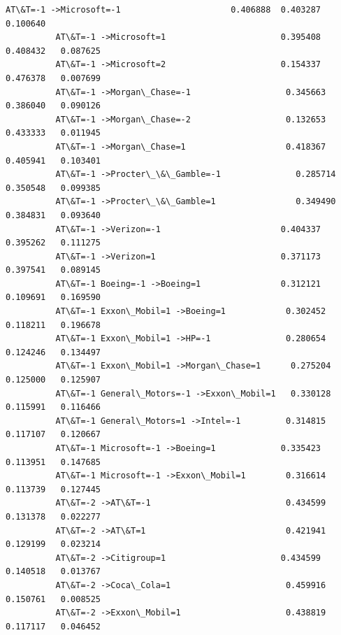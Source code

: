 \documentclass[11pt]{article}
\begin{document}
\begin{Verbatim}[commandchars=\\\{\}]
          AT\&T=-1 ->Microsoft=-1                      0.406888  0.403287   0.100640   
          AT\&T=-1 ->Microsoft=1                       0.395408  0.408432   0.087625   
          AT\&T=-1 ->Microsoft=2                       0.154337  0.476378   0.007699   
          AT\&T=-1 ->Morgan\_Chase=-1                   0.345663  0.386040   0.090126   
          AT\&T=-1 ->Morgan\_Chase=-2                   0.132653  0.433333   0.011945   
          AT\&T=-1 ->Morgan\_Chase=1                    0.418367  0.405941   0.103401   
          AT\&T=-1 ->Procter\_\&\_Gamble=-1               0.285714  0.350548   0.099385   
          AT\&T=-1 ->Procter\_\&\_Gamble=1                0.349490  0.384831   0.093640   
          AT\&T=-1 ->Verizon=-1                        0.404337  0.395262   0.111275   
          AT\&T=-1 ->Verizon=1                         0.371173  0.397541   0.089145   
          AT\&T=-1 Boeing=-1 ->Boeing=1                0.312121  0.109691   0.169590   
          AT\&T=-1 Exxon\_Mobil=1 ->Boeing=1            0.302452  0.118211   0.196678   
          AT\&T=-1 Exxon\_Mobil=1 ->HP=-1               0.280654  0.124246   0.134497   
          AT\&T=-1 Exxon\_Mobil=1 ->Morgan\_Chase=1      0.275204  0.125000   0.125907   
          AT\&T=-1 General\_Motors=-1 ->Exxon\_Mobil=1   0.330128  0.115991   0.116466   
          AT\&T=-1 General\_Motors=1 ->Intel=-1         0.314815  0.117107   0.120667   
          AT\&T=-1 Microsoft=-1 ->Boeing=1             0.335423  0.113951   0.147685   
          AT\&T=-1 Microsoft=-1 ->Exxon\_Mobil=1        0.316614  0.113739   0.127445   
          AT\&T=-2 ->AT\&T=-1                           0.434599  0.131378   0.022277   
          AT\&T=-2 ->AT\&T=1                            0.421941  0.129199   0.023214   
          AT\&T=-2 ->Citigroup=1                       0.434599  0.140518   0.013767   
          AT\&T=-2 ->Coca\_Cola=1                       0.459916  0.150761   0.008525   
          AT\&T=-2 ->Exxon\_Mobil=1                     0.438819  0.117117   0.046452   
          

\end{Verbatim}
\end{document}

